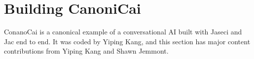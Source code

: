 \chapter{Building CanoniCai}
\minitoc
ConanoCai is a canonical example of a conversational AI built with Jaseci and Jac end to end.
It was coded by Yiping Kang, and this section has major content contributions from Yiping Kang and Shawn Jemmont.

